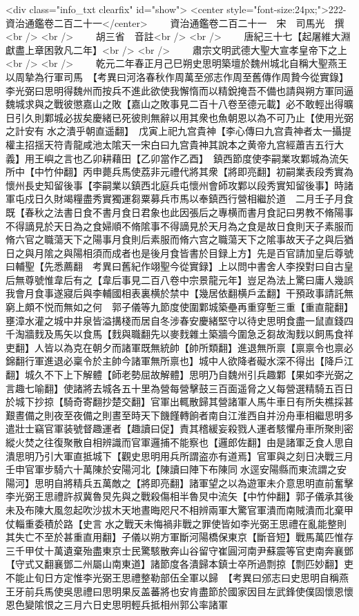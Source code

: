 <div class="info_txt clearfix" id="show">
<center style="font-size:24px;">222-資治通鑑卷二百二十一</center>
  　　資治通鑑卷二百二十一　宋　司馬光　撰<br />
<br />
　　胡三省　音註<br />
<br />
　　唐紀三十七【起屠維大淵獻盡上章困敦凡二年】<br />
<br />
　　肅宗文明武德大聖大宣孝皇帝下之上<br />
<br />
　　乾元二年春正月己巳朔史思明築壇於魏州城北自稱大聖燕王以周摯為行軍司馬　【考異曰河洛春秋作周萬至邠志作周至舊傳作周贄今從實錄】李光弼曰思明得魏州而按兵不進此欲使我懈惰而以精銳掩吾不備也請與朔方軍同逼魏城求與之戰彼懲嘉山之敗【嘉山之敗事見二百十八卷至德元載】必不敢輕出得曠日引久則鄴城必拔矣慶緒已死彼則無辭以用其衆也魚朝恩以為不可乃止【使用光弼之計安有水之潰乎朝直遥翻】　戊寅上祀九宫貴神【李心傳曰九宫貴神者太一攝提權主招揺天符青龍咸池太隂天一宋白曰九宫貴神其說本之黄帝九宫經蕭吉五行大義】用王嶼之言也乙卯耕藉田【乙卯當作乙酉】　鎮西節度使李嗣業攻鄴城為流矢所中【中竹仲翻】丙申薨兵馬使荔非元禮代將其衆【將即亮翻】初嗣業表段秀實為懷州長史知留後事【李嗣業以鎮西北庭兵屯懷州會師攻鄴以段秀實知留後事】時諸軍屯戍日久財竭糧盡秀實獨運芻粟募兵市馬以奉鎮西行營相繼於道　二月壬子月食既【春秋之法書日食不書月食日君象也此因張后之專横而書月食記曰男教不脩陽事不得謫見於天日為之食婦順不脩隂事不得謫見於天月為之食是故日食則天子素服而脩六官之職蕩天下之陽事月食則后素服而脩六宫之職蕩天下之隂事故天子之與后猶日之與月隂之與陽相須而成者也是後月食皆書於目録上方】先是百官請加皇后尊號曰輔聖【先悉薦翻　考異曰舊紀作翊聖今從實録】上以問中書舍人李揆對曰自古皇后無尊號惟韋后有之【韋后事見二百八卷中宗景龍元年】豈足為法上驚曰庸人幾誤我會月食事遂寢后與李輔國相表裏横於禁中【幾居依翻横戶孟翻】干預政事請託無窮上頗不悦而無如之何　郭子儀等九節度使圍鄴城築壘再重穿塹三重【重直龍翻】壅漳水灌之城中井泉皆溢搆棧而居自冬涉春安慶緒堅守以待史思明食盡一鼠直錢四千淘牆䴰及馬矢以食馬【䴰與職翻先以麥䴰雜土築牆今圍急乏芻故淘䴰以飼馬食祥吏翻】人皆以為克在朝夕而諸軍既無統帥【帥所類翻】進退無所禀【禀禀令也禀必錦翻行軍進退必稟令於主帥今諸軍無所禀也】城中人欲降者礙水深不得出【降戶江翻】城久不下上下解體【師老勢屈故解體】思明乃自魏州引兵趣鄴【果如李光弼之言趣七喻翻】使諸將去城各五十里為營每營擊鼓三百面遥脅之乂每營選精騎五百日於城下抄掠【騎奇寄翻抄楚交翻】官軍出輒散歸其營諸軍人馬牛車日有所失樵採甚艱晝備之則夜至夜備之則晝至時天下饑饉轉餉者南自江淮西自并汾舟車相繼思明多遣壯士竊官軍装號督趣運者【趣讀曰促】責其稽緩妄殺戮人運者駭懼舟車所聚則密縱火焚之往復聚散自相辨識而官軍邏捕不能察也【邏郎佐翻】由是諸軍乏食人思自潰思明乃引大軍直抵城下【觀史思明用兵所謂盗亦有道焉】官軍與之刻日决戰三月壬申官軍步騎六十萬陳於安陽河北【陳讀曰陣下布陳同水逕安陽縣而東流謂之安陽河】思明自將精兵五萬敵之【將即亮翻】諸軍望之以為遊軍未介意思明直前奮擊李光弼王思禮許叔冀魯炅先與之戰殺傷相半魯炅中流矢【中竹仲翻】郭子儀承其後未及布陳大風忽起吹沙拔木天地晝晦咫尺不相辨兩軍大驚官軍潰而南賊潰而北棄甲仗輜重委積於路【史言水之戰天未悔禍非戰之罪使皆如李光弼王思禮在亂能整則其失亡不至於甚重直用翻】子儀以朔方軍斷河陽橋保東京【斷音短】戰馬萬匹惟存三千甲仗十萬遺棄殆盡東京士民驚駭散奔山谷留守崔圓河南尹蘇震等官吏南奔襄鄧【守式又翻襄鄧二州屬山南東道】諸節度各潰歸本鎮士卒所過剽掠【剽匹妙翻】吏不能止旬日方定惟李光弼王思禮整勒部伍全軍以歸　【考異曰邠志曰史思明自稱燕王牙前兵馬使吳思禮曰思明果反盖蕃將也安肯盡節於國家因目左武鋒使僕固懷恩懷恩色變隂恨之三月六日史思明輕兵抵相州郭公率諸軍